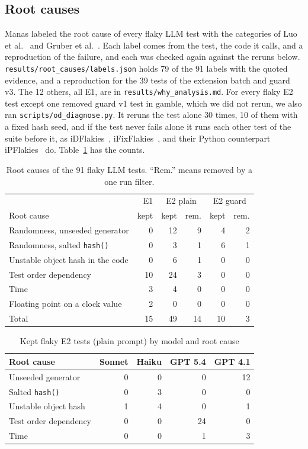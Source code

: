 \documentclass[sigconf,nonacm]{acmart}
\begin{document}
\subsection{Root causes}
\label{sec:rootcause}
Manas labeled the root cause of every flaky LLM test with the categories of Luo et al.~\cite{luo2014} and Gruber et al.~\cite{gruber2021}. Each label comes from the test, the code it calls, and a reproduction of the failure, and each was checked again against the reruns below. \texttt{results/root\_causes/labels.json} holds 79 of the 91 labels with the quoted evidence, and a reproduction for the 39 tests of the extension batch and guard v3. The 12 others, all E1, are in \texttt{results/why\_analysis.md}. For every flaky E2 test except one removed guard v1 test in gamble, which we did not rerun, we also ran \texttt{scripts/od\_diagnose.py}. It reruns the test alone 30 times, 10 of them with a fixed hash seed, and if the test never fails alone it runs each other test of the suite before it, as iDFlakies~\cite{lam2019}, iFixFlakies~\cite{shi2019}, and their Python counterpart iPFlakies~\cite{wang2022} do. Table~\ref{tab:rc} has the counts.

\begin{table}[h]
\caption{Root causes of the 91 flaky LLM tests. ``Rem.'' means removed by a one run filter.}
\label{tab:rc}
\small
\setlength{\tabcolsep}{4pt}
\begin{tabularx}{\columnwidth}{Xrrrrr}
\toprule
 & E1 & \multicolumn{2}{c}{E2 plain} & \multicolumn{2}{c}{E2 guard} \\
Root cause & kept & kept & rem. & kept & rem. \\
\midrule
Randomness, unseeded generator & 0 & 12 & 9 & 4 & 2 \\
Randomness, salted \texttt{hash()} & 0 & 3 & 1 & 6 & 1 \\
Unstable object hash in the code & 0 & 6 & 1 & 0 & 0 \\
Test order dependency & 10 & 24 & 3 & 0 & 0 \\
Time & 3 & 4 & 0 & 0 & 0 \\
Floating point on a clock value & 2 & 0 & 0 & 0 & 0 \\
\midrule
Total & 15 & 49 & 14 & 10 & 3 \\
\bottomrule
\end{tabularx}
\end{table}

\begin{table}[h]
\caption{Kept flaky E2 tests (plain prompt) by model and root cause}
\label{tab:modelcause}
\small
\setlength{\tabcolsep}{3pt}
\begin{tabularx}{\columnwidth}{Xrrrr}
\toprule
Root cause & Sonnet & Haiku & GPT 5.4 & GPT 4.1 \\
\midrule
Unseeded generator & 0 & 0 & 0 & 12 \\
Salted \texttt{hash()} & 0 & 3 & 0 & 0 \\
Unstable object hash & 1 & 4 & 0 & 1 \\
Test order dependency & 0 & 0 & 24 & 0 \\
Time & 0 & 0 & 1 & 3 \\
\bottomrule
\end{tabularx}
\end{table}
\end{document}
